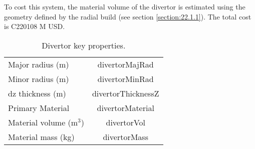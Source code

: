 To cost this system, the material volume of the divertor is estimated using the geometry defined by the radial build (see section \ref{section:22.1.1}). The total cost is C220108 M USD.


 
 \begin{table}
     \centering
     \begin{tabular}{lc}
     \hline
         Major radius (m)& divertorMajRad\\
         Minor radius (m) & divertorMinRad\\
         dz thickness (m) & divertorThicknessZ\\
         Primary Material & divertorMaterial\\
         Material volume (m$^3$)& divertorVol\\
         Material mass (kg) & divertorMass\\
         \hline
     \end{tabular}
     \caption{Divertor key properties.}
     \label{tab:divertor prop}
 \end{table}

